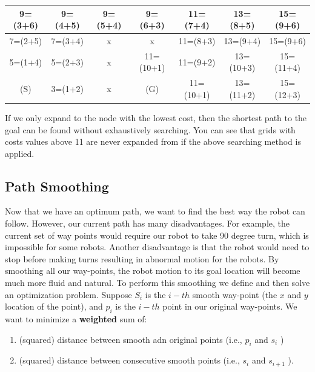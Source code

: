 \documentclass[twoside,11pt]{article}
\begin{document}
\begin{table}[ht]
	\label{tab:map-5}
	\begin{center}
		\begin{tabular}{|c|c|c|c|c|c|c|}
			\hline
			9=(3+6) & 9=(4+5) & 9=(5+4) & 9=(6+3) & 11=(7+4) & 13=(8+5) & 15=(9+6) \\
			\hline
			7=(2+5) & 7=(3+4) & x & x & 11=(8+3) & 13=(9+4) & 15=(9+6) \\
			\hline
			5=(1+4) & 5=(2+3) & x & 11=(10+1) & 11=(9+2) & 13=(10+3) & 15=(11+4) \\
			\hline
			(S) & 3=(1+2) & x & (G) & 11=(10+1) & 13=(11+2) & 15=(12+3) \\
			\hline
		\end{tabular}
	\end{center}
\end{table}

If we only expand to the node with the lowest cost, then the shortest path to the goal can be
found without exhaustively searching. You can see that grids with costs values above 11 are never
expanded from if the above searching method is applied.


\subsection*{Path Smoothing}
Now that we have an optimum path, we want to find the best way the robot can follow. However,
our current path has many disadvantages. For example, the current set of way points would require
our robot to take 90 degree turn, which is impossible for some robots. Another disadvantage is that
the robot would need to stop before making turns resulting in abnormal motion for the robots.
By smoothing all our way-points, the robot motion to its goal location will become much more
fluid and natural. To perform this smoothing we define and then solve an optimization problem.
Suppose ${S_i}$ is the $i − th$ smooth way-point (the ${x}$ and ${y}$ location of the point), and $p_i$ is the $i − th$ point in our original way-points. We want to minimize a \textbf{weighted} sum of:

\begin{enumerate}
  \item (squared) distance between smooth adn original points (i.e., $p_i$ and $s_i$ )
  \item (squared) distance between consecutive smooth points (i.e., $s_i$ and $s_{i+1}$ ).
\end{enumerate}
\end{document}
